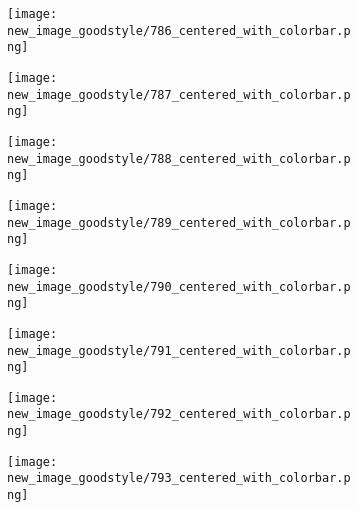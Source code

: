 \documentclass[a4paper,12pt]{article}
\begin{document}
\begin{figure}[H]
  \begin{subfigure}{0.11\textwidth}
    \texttt{[image: new\_image\_goodstyle/786\_centered\_with\_colorbar.png]}
  \end{subfigure}
  \hfill
  \begin{subfigure}{0.11\textwidth}
    \texttt{[image: new\_image\_goodstyle/787\_centered\_with\_colorbar.png]}
  \end{subfigure}
  \hfill
  \begin{subfigure}{0.11\textwidth}
    \texttt{[image: new\_image\_goodstyle/788\_centered\_with\_colorbar.png]}
  \end{subfigure}
  \hfill
  \begin{subfigure}{0.11\textwidth}
    \texttt{[image: new\_image\_goodstyle/789\_centered\_with\_colorbar.png]}
  \end{subfigure}
  \hfill
  \begin{subfigure}{0.11\textwidth}
    \texttt{[image: new\_image\_goodstyle/790\_centered\_with\_colorbar.png]}
  \end{subfigure}
  \hfill
  \begin{subfigure}{0.11\textwidth}
    \texttt{[image: new\_image\_goodstyle/791\_centered\_with\_colorbar.png]}
  \end{subfigure}
  \hfill
  \begin{subfigure}{0.11\textwidth}
    \texttt{[image: new\_image\_goodstyle/792\_centered\_with\_colorbar.png]}
  \end{subfigure}
  \hfill
  \begin{subfigure}{0.11\textwidth}
    \texttt{[image: new\_image\_goodstyle/793\_centered\_with\_colorbar.png]}
  \end{subfigure}
  \hfill
\end{figure}
\end{document}
